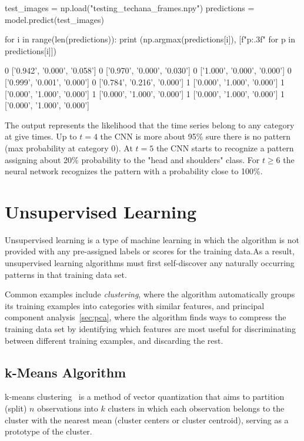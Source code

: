 \begin{ipythonnon}
test_images = np.load("testing_techana_frames.npy")
predictions = model.predict(test_images)

for i in range(len(predictions)):
    print (np.argmax(predictions[i]), [f"{p:.3f}" for p in predictions[i]])
\end{ipythonnon}
\begin{ioutput}
0 ['0.942', '0.000', '0.058']
0 ['0.970', '0.000', '0.030']
0 ['1.000', '0.000', '0.000']
0 ['0.999', '0.001', '0.000']
0 ['0.784', '0.216', '0.000']
1 ['0.000', '1.000', '0.000']
1 ['0.000', '1.000', '0.000']
1 ['0.000', '1.000', '0.000']
1 ['0.000', '1.000', '0.000']
1 ['0.000', '1.000', '0.000']
\end{ioutput}
\noindent
The output represents the likelihood that the time series  belong to any category at give times. Up to $t=4$ the CNN is more about 95\% sure there is no pattern (max probability at category 0). 
At $t=5$ the CNN starts to recognize a pattern assigning about 20\% probability to the "head and shoulders" class. For $t\geq 6$ the neural network recognizes the pattern with a probability close to 100\%.

\section{Unsupervised Learning}
    
Unsupervised learning is a type of machine learning in which the algorithm is not provided with any pre-assigned labels or scores for the training data.As a result, unsupervised learning algorithms must first self-discover any naturally occurring patterns in that training data set. 
    
Common examples include \emph{clustering}, where the algorithm automatically groups its training examples into categories with similar features, and principal component analysis~\ref{sec:pca}, where the algorithm finds ways to compress the training data set by identifying which features are most useful for discriminating between different training examples, and discarding the rest. 
    
\subsection{k-Means Algorithm}
    
k-means clustering~\cite{bib:k-means} is a method of vector quantization that aims to partition (split) $n$ observations into $k$ clusters in which each observation belongs to the cluster with the nearest mean (cluster centers or cluster centroid), serving as a prototype of the cluster. 
    
